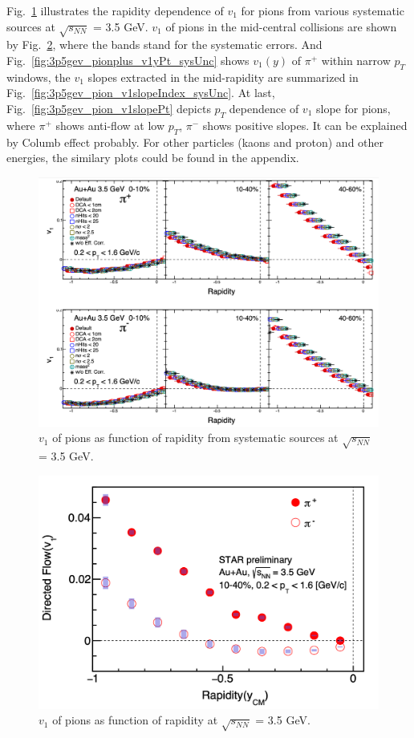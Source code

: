 Fig.~\ref{fig:3p5gev_pion_v1y_sysUnc} illustrates the rapidity dependence of $v_1$ for pions from various systematic sources at $\sqrt{s_{NN}}$ = 3.5 GeV.
$v_1$ of pions in the mid-central collisions are shown by Fig.~\ref{fig:3p5gev_pion_v1y}, where the bands stand for the systematic errors.
And Fig.~\ref{fig:3p5gev_pionplus_v1yPt_sysUnc} shows $v_1(y)$ of $\pi^{+}$ within narrow $p_T$ windows, 
the $v_1$ slopes extracted in the mid-rapidity are summarized in Fig.~\ref{fig:3p5gev_pion_v1slopeIndex_sysUnc}.
At last, Fig.~\ref{fig:3p5gev_pion_v1slopePt} depicts $p_T$ dependence of $v_1$ slope for pions, 
where $\pi^+$ shows anti-flow at low $p_T$, $\pi^-$ shows positive slopes. It can be explained by Columb effect probably. 
For other particles (kaons and proton) and other energies, the similary plots could be found in the appendix. 
\begin{figure}[hbt!]
\centering
\includegraphics[width=0.95\linewidth]{figures/chapter03/3p5gev_pion_v1y_sysUnc.png}
\caption{$v_1$ of pions as function of rapidity from systematic sources at $\sqrt{s_{NN}}$ = 3.5 GeV.}
\label{fig:3p5gev_pion_v1y_sysUnc}
\end{figure}

\begin{figure}[hbt!]
\centering
\includegraphics[width=0.65\linewidth]{figures/chapter03/3p5gev_pion_v1y.png}
\caption{$v_1$ of pions as function of rapidity at $\sqrt{s_{NN}}$ = 3.5 GeV.}
\label{fig:3p5gev_pion_v1y}
\end{figure}

